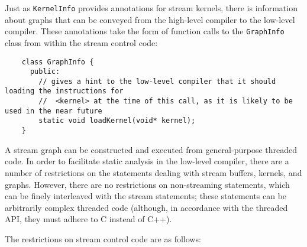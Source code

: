 
Just as {\tt KernelInfo} provides annotations for stream kernels, there is information about
graphs that can be conveyed from the high-level compiler to the low-level compiler.  These
annotations take the form of function calls to the {\tt GraphInfo} class from within the stream
control code:
{\small
\begin{verbatim}
    class GraphInfo {
      public:
        // gives a hint to the low-level compiler that it should loading the instructions for
        //  <kernel> at the time of this call, as it is likely to be used in the near future
        static void loadKernel(void* kernel);
    }
\end{verbatim}}


A stream graph can be constructed and executed from general-purpose threaded code.  In order to
facilitate static analysis in the low-level compiler, there are a number of restrictions on the
statements dealing with stream buffers, kernels, and graphs.  However, there are no
restrictions on non-streaming statements, which can be finely interleaved with the stream
statements; these statements can be arbitrarily complex threaded code (although, in accordance
with the threaded API, they must adhere to C instead of C++).

The restrictions on stream control code are as follows:

